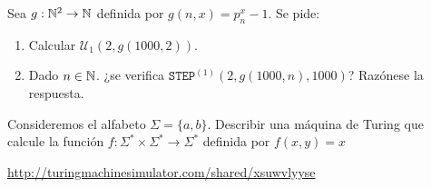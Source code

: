\documentclass[twoside]{article}
\begin{document}
\begin{ejercicio}{4}
Sea $g : \mathbb{N}^2 \to \mathbb{N}$ definida por $g(n, x) = p^x_n - 1$. Se pide:
\begin{enumerate}
\item Calcular $\mathcal{U}_1(2, g(1000, 2))$.
\item Dado $n \in \mathbb{N}$. ¿se verifica $\texttt{STEP}^{(1)}(2, g(1000, n), 1000)$? Razónese la respuesta.
\end{enumerate}
\end{ejercicio}
\begin{solucion}
\end{solucion}

\newpage

\begin{ejercicio}{5}
Consideremos el alfabeto $\Sigma = \{a, b\}$. Describir una máquina de
Turing que calcule la función $f : \Sigma^* \times \Sigma^* \to \Sigma^*$ definida por $f(x, y) = x$
\end{ejercicio}
\begin{solucion}
\url{http://turingmachinesimulator.com/shared/xsuwvlyyse}
\end{solucion}
\end{document}

